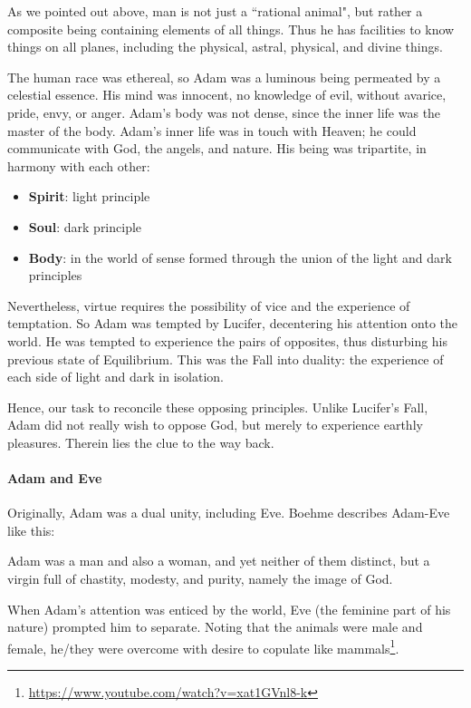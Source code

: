 As we pointed out above, man is not just a ``rational animal", but rather a composite being containing elements of all things. Thus he has facilities to know things on all planes, including the physical, astral, physical, and divine things.

The human race was ethereal, so Adam was a luminous being permeated by a celestial essence. His mind was innocent, no knowledge of evil, without avarice, pride, envy, or anger. Adam's body was not dense, since the inner life was the master of the body. Adam's inner life was in touch with Heaven; he could communicate with God, the angels, and nature. His being was tripartite, in harmony with each other:

\begin{itemize}
\item \textbf{Spirit}: light principle 
\item \textbf{Soul}: dark principle 
\item \textbf{Body}: in the world of sense formed through the union of the light and dark principles 
\end{itemize}
Nevertheless, virtue requires the possibility of vice and the experience of temptation. So Adam was tempted by Lucifer, decentering his attention onto the world. He was tempted to experience the pairs of opposites, thus disturbing his previous state of Equilibrium. This was the Fall into duality: the experience of each side of light and dark in isolation.

Hence, our task to reconcile these opposing principles. Unlike Lucifer's Fall, Adam did not really wish to oppose God, but merely to experience earthly pleasures. Therein lies the clue to the way back.

\paragraph{Adam and Eve}
Originally, Adam was a dual unity, including Eve. Boehme describes Adam-Eve like this:

\begin{quotex}
Adam was a man and also a woman, and yet neither of them distinct, but a virgin full of chastity, modesty, and purity, namely the image of God.

\end{quotex}
When Adam's attention was enticed by the world, Eve (the feminine part of his nature) prompted him to separate. Noting that the animals were male and female, he/they were overcome with desire to copulate like mammals\footnote{\url{https://www.youtube.com/watch?v=xat1GVnl8-k}}.

